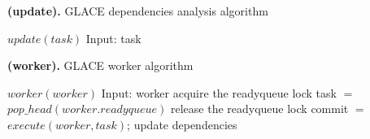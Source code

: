 \documentclass[preprint,11pt]{elsarticle}
\begin{document}
\begin{algorithm}
\caption{{\bf (update).} GLACE dependencies analysis algorithm}
\label{alg:update}
{\footnotesize
\begin{algorithmic} [1]
\STATE $update(task)$
\STATE Input: task
\STATE
\end{algorithmic}
}
\end{algorithm}






\begin{algorithm}
\caption{{\bf (worker).} GLACE worker algorithm}
\label{alg:worker}
{\footnotesize
\begin{algorithmic} [1]
\STATE $worker(worker)$
\STATE Input: worker
  \STATE acquire the readyqueue lock
  \STATE task $=$ $pop\_head(worker.readyqueue)$
  \STATE release the readyqueue lock
    \STATE commit $=$ $execute(worker, task)$;
      \STATE update dependencies
    \ENDIF
  \ENDIF
\ENDWHILE
\end{algorithmic}
}
\end{algorithm}

\end{document}
